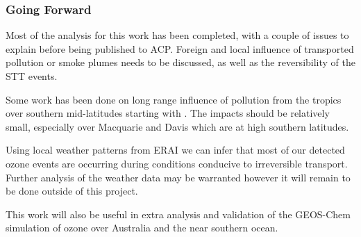 \subsubsection{Going Forward}

Most of the analysis for this work has been completed, with a couple of issues to explain before being published to ACP.
Foreign and local influence of transported pollution or smoke plumes needs to be discussed, as well as the reversibility of the STT events.

Some work has been done on long range influence of pollution from the tropics over southern mid-latitudes starting with \citet{Pak_2003}. The impacts should be relatively small, especially over Macquarie and Davis which are at high southern latitudes.

Using local weather patterns from ERAI we can infer that most of our detected ozone events are occurring during conditions conducive to irreversible transport. Further analysis of the weather data may be warranted however it will remain to be done outside of this project.

This work will also be useful in extra analysis and validation of the GEOS-Chem simulation of ozone over Australia and the near southern ocean.